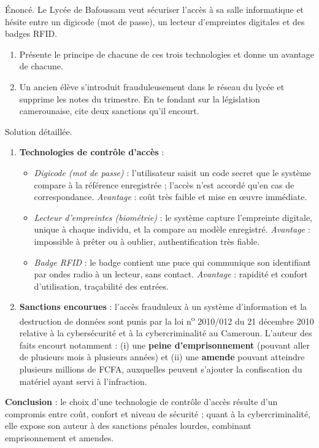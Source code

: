 \documentclass[11pt]{article}
\begin{document}
\begin{exoresolu}
Énoncé. Le Lycée de Bafoussam veut sécuriser l'accès à sa salle informatique et hésite entre un digicode (mot de passe), un lecteur d'empreintes digitales et des badges RFID.
\begin{enumerate}
  \item Présente le principe de chacune de ces trois technologies et donne un avantage de chacune.
  \item Un ancien élève s'introduit frauduleusement dans le réseau du lycée et supprime les notes du trimestre. En te fondant sur la législation camerounaise, cite deux sanctions qu'il encourt.
\end{enumerate}
\tcblower
Solution détaillée.
\begin{enumerate}
  \item \textbf{Technologies de contrôle d'accès} :
  \begin{itemize}
    \item \emph{Digicode (mot de passe)} : l'utilisateur saisit un code secret que le système compare à la référence enregistrée ; l'accès n'est accordé qu'en cas de correspondance. \emph{Avantage} : coût très faible et mise en œuvre immédiate.
    \item \emph{Lecteur d'empreintes (biométrie)} : le système capture l'empreinte digitale, unique à chaque individu, et la compare au modèle enregistré. \emph{Avantage} : impossible à prêter ou à oublier, authentification très fiable.
    \item \emph{Badge RFID} : le badge contient une puce qui communique son identifiant par ondes radio à un lecteur, sans contact. \emph{Avantage} : rapidité et confort d'utilisation, traçabilité des entrées.
  \end{itemize}
  \item \textbf{Sanctions encourues} : l'accès frauduleux à un système d'information et la destruction de données sont punis par la loi n\textsuperscript{o} 2010/012 du 21 décembre 2010 relative à la cybersécurité et à la cybercriminalité au Cameroun. L'auteur des faits encourt notamment : (i) une \textbf{peine d'emprisonnement} (pouvant aller de plusieurs mois à plusieurs années) et (ii) une \textbf{amende} pouvant atteindre plusieurs millions de FCFA, auxquelles peuvent s'ajouter la confiscation du matériel ayant servi à l'infraction.
\end{enumerate}
\textbf{Conclusion} : le choix d'une technologie de contrôle d'accès résulte d'un compromis entre coût, confort et niveau de sécurité ; quant à la cybercriminalité, elle expose son auteur à des sanctions pénales lourdes, combinant emprisonnement et amendes.
\end{exoresolu}
\end{document}
